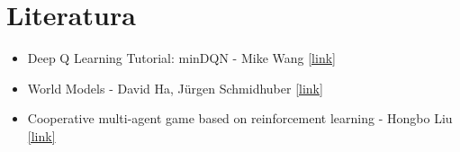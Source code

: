 \documentclass[12pt, a4paper]{article}
\begin{document}
\section{Literatura}

\begin{itemize}
	\item Deep Q Learning Tutorial: minDQN - Mike Wang \href{https://towardsdatascience.com/deep-q-learning-tutorial-mindqn-2a4c855abffc}{[link]}
	\item World Models - David Ha, J\"{u}rgen Schmidhuber \href{https://arxiv.org/pdf/1803.10122}{[link]}
	\item Cooperative multi-agent game based on reinforcement learning - Hongbo Liu \href{https://pdf.sciencedirectassets.com/779309/1-s2.0-S2667295223X00063/1-s2.0-S2667295224000084/main.pdf?X-Amz-Security-Token=IQoJb3JpZ2luX2VjELT%2F%2F%2F%2F%2F%2F%2F%2F%2F%2FwEaCXVzLWVhc3QtMSJHMEUCIQDZDXc5ZujfCeSPh49Esd68qM2jLVv1zuQjXgVdKnNt1gIgaeX%2BHExuymN0xv5OK9d%2B0sMdMvwA7IoNrApZgOY4dSQqsgUIHBAFGgwwNTkwMDM1NDY4NjUiDA4AkTuzkkdaGvCYlyqPBZdbZvl%2FUmEuTBpFkOlqavh5Dk%2FPy2HyE3OQLepAZpCyI%2F%2BV2nmhTt1BtOMJkDjOCld9iKzBpD4rgSqShPhAvVMVWUTbaC7MayHlIVcwz5wRyRA3pSVi9zpIjNq1mr2tjJ4Qigsspw3%2B6I4klhVIRXKjA2GufbfUP8m7h2fyyZntm7%2BXrQYc07jJkZkuOGJfwcVeO1JN%2FZ9FuEq24LG7bq%2FR2bLfI6Ti9fUmAx%2BBooHAighFSwGMudy6w%2FXyYtDN%2FtBaSy9p%2B%2F%2BVPy3M4B58hejxqp4d7QpRfrGqmzX0L1hcBLzx%2FmYCfZiZaYMQMCH2kZEVhZOWqBpS5BV%2FsaVPFY4VF2lvQTZilezfUyWRkh49uXanDwYLX9iDB%2F5LVLhUq%2FbByMbuPOo4BFDWvJRnNfbWu34ZJSgoHKmhNedaArodgru7xr5TaZ8B35KrUyAp%2FKpOE6TLE7OwgDAorraD0yDMbgCMCZahvELM%2BvV4QCPdO0P%2FAbiAwS5gMb1sPnem9%2FIgF%2FfEVEYvEFnT2q1997074NZ4OMledGNlc8i8UvEl0Sf2fUiKPYZbNoM%2B3dm00y3abSkeO%2B%2FYodh7AomvThzAFTNZ9bbVBfY5fJnVKoywE7%2B4ZmE1Vf3F2aDqmbZfMOaHw2Kfj25aIBkUJJX0VCoSLaPVl0iVUoBqeHwzezz6j4RFPkr443d3eDQ%2BVpa4dtfjiCmsYvuC3d8g0mbC37qWRcDPD57ueGejfVtn8yvNugtvd%2BlJU1GqT1c6YLAsnaGQNk84xTSu8F5o1gdKXMYbzAIIn3ieO%2Ff1T3xR6dEA%2B0vjTWqm5AzWdVto94iqInaIWefD1nUPL1Uc34SwebSg11mBLuNA3dHOjLvR4Lwww770sQY6sQHwDYcZCKZJ9yJVMuTuR6CjFkdj8WxkPU7jcEul0GaaVziB8bpCENuHvzjGKzY6OPQxlYFZTsnYajk9IY%2FiJKqYZ57b1d6GgpH7x%2FHtewIpY4iFMYWcs1%2Bcr4WCTwzhHKKz%2FZaG7yS7z%2FrSLWcVX%2FoQ5cdQ4ZsV9f02XOglsX9%2FnrqjmB1Y4nRvfr%2BcRk7JKWB8q0d2qze5aar5G7NcnYpjpdQHrvE4HD5yiy3utG6%2Bswg%3D&X-Amz-Algorithm=AWS4-HMAC-SHA256&X-Amz-Date=20240509T200815Z&X-Amz-SignedHeaders=host&X-Amz-Expires=300&X-Amz-Credential=ASIAQ3PHCVTYWLNNRAB7%2F20240509%2Fus-east-1%2Fs3%2Faws4_request&X-Amz-Signature=dcd93fa58122750a1933b3a2732fb412468e188e995fd040ffac08322aa889ba&hash=6d82e36a5daee7032af9dd1cb2f688325eacdf392225b0296cda5a5d5e8ee1d9&host=68042c943591013ac2b2430a89b270f6af2c76d8dfd086a07176afe7c76c2c61&pii=S2667295224000084&tid=spdf-d803b0a6-f304-4104-8244-d06a6158f851&sid=c8e2157f5b9dd941a60969c-2d0d334475bfgxrqb&type=client&tsoh=d3d3LnNjaWVuY2VkaXJlY3QuY29t&ua=17145a56525a54515e54&rr=88145206eb2eb30c&cc=rs}{[link]}

\end{itemize}
\end{document}
